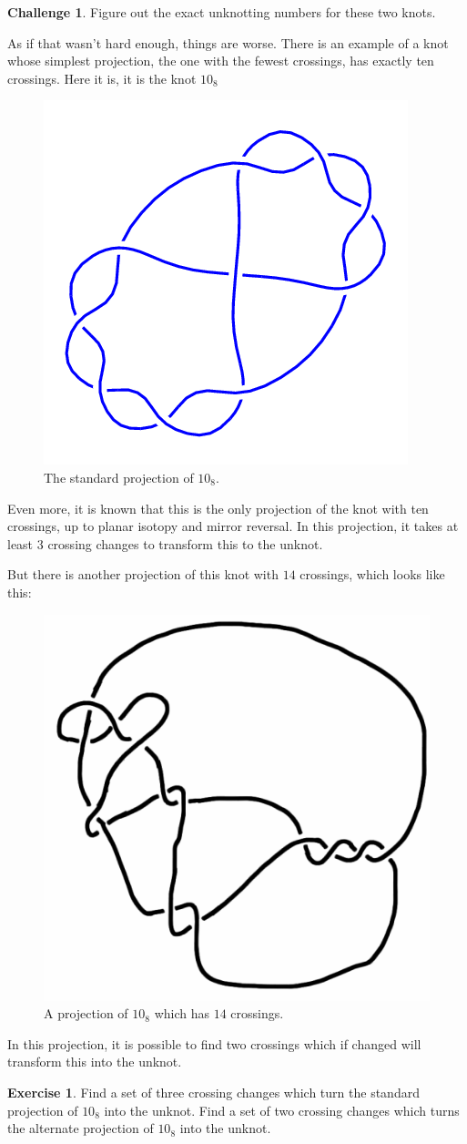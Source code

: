 \documentclass[12pt,letterpaper]{article}
\theoremstyle{definition}
\newtheorem{exercise}[question]{Exercise}
\newtheorem*{challenge}{Challenge}
\begin{document}
\begin{challenge}
Figure out the exact unknotting numbers for these two knots.
\end{challenge}

As if that wasn't hard enough, things are worse.
There is an example of a knot whose simplest projection, the one with the fewest crossings, has exactly ten crossings. 
Here it is, it is the knot $10_8$
\begin{figure}[h!]
    \centering
    \includegraphics[width=.3\textwidth]{rgp12pics/10_8.png}
    \caption{The standard projection of $10_8$.}
\end{figure}
Even more, it is known that this is the only projection of the knot with ten crossings, up to planar isotopy and mirror reversal.
In this projection, it takes at least $3$ crossing changes to transform this to the unknot.

But there is another projection of this knot with $14$ crossings, which looks like this:
\begin{figure}[h!]
    \centering
    \includegraphics[width=.3\textwidth]{rgp12pics/10-8-14crossings.png}
    \caption{A projection of $10_8$ which has $14$ crossings.}
\end{figure}
In this projection, it is possible to find two crossings which if changed will transform this into the unknot.

\begin{exercise}
Find a set of three crossing changes which turn the standard projection of $10_8$ into the unknot.
Find a set of two crossing changes which turns the alternate projection of $10_8$ into the unknot.
\end{exercise}
\end{document}

